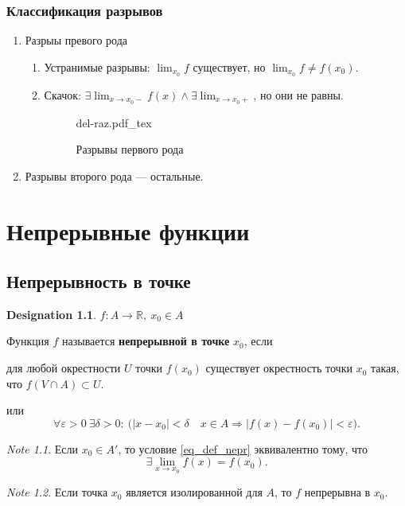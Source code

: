 \documentclass[11pt]{book}
\newcommand{\incfig}[1]{%
    \def\svgwidth{\columnwidth}
    {#1.pdf_tex}
}
\newcommand{\R}{\mathbb{R}}
\theoremstyle{definition}
\theoremstyle{plain}
\theoremstyle{plain}
\theoremstyle{definition}
\newtheorem*{name}{Designation}
\theoremstyle{remark}
\newtheorem*{note}{Note}
\begin{document}
\subsection{Классификация разрывов}
\begin{enumerate}
    \item Разрыы превого рода
	\begin{enumerate}
	    \item Устранимые разрывы: $ \lim_{x_0} f$ существует, но $ \lim_{x_0} f \ne f(x_0)$.
	    \item Скачок: $ \exists \lim_{x \to  x_0-} f(x) \wedge \exists \lim_{x \to  x_0+} $, но они не равны.
		\begin{figure}[ht]
    \centering
    \incfig{del-raz}
    \caption{Разрывы первого рода}
    \label{fig:del-raz}
\end{figure}
	\end{enumerate}
    \item  Разрывы второго рода --- остальные.
\end{enumerate}
\chapter{Непрерывные функции}
\section{Непрерывность в точке}
\begin{name}
    $ f: A \to  \R, ~ x_0 \in  A$
\end{name}
\begin{defn}
    Функция $ f$ называется {\bf непрерывной в точке} $ x_0$, если
    \begin{description}
	\item
	    для любой окрестности $ U$ точки  $ f(x_0)$ существует окрестность точки $ x_0$ такая, что $ f(V \cap A) \subset U$.
	\item или
	    \begin{equation}\label{eq_def_nepr}
		\forall \varepsilon >0 ~ \exists \delta >0: ~ \bigl( |x-x_0| < \delta \quad x \in A \Longrightarrow  |f(x) - f(x_0)| < \varepsilon \bigr).
	    \end{equation}
    \end{description}
\end{defn}
\begin{note}
    Если  $ x_0 \in A'$, то условие \ref{eq_def_nepr} эквивалентно тому, что \[
	\exists \lim_{x \to  x_0} f(x) = f(x_0)
    .\]
\end{note}
\begin{note}
    Если точка $ x_0$ является изолированной для $ A$, то  $ f$ непрерывна в $ x_0$.
\end{note}
\end{document}
